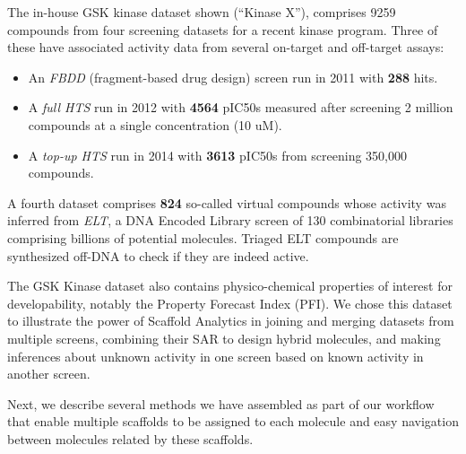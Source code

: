 \documentclass[journal=jacsat,biochem,manuscript=article]{achemso}
\newcommand*\tref[1]{Table~\ref{table:#1}}
\begin{document}
The in-house GSK kinase dataset shown (``Kinase X''), comprises 9259
compounds from four screening datasets for a recent kinase program.
Three of these have associated activity data from several on-target and off-target
assays: 
\begin{itemize}
\item An {\it FBDD}\cite{FBDD} (fragment-based drug design) screen run in 2011 with {\bf 288} hits.
\item A {\it full HTS} run in 2012 with {\bf 4564} {pIC50s} measured after screening 2 million compounds at a single concentration (10 uM).
\item A {\it top-up HTS} run in 2014 with {\bf 3613} {pIC50s} from screening 350,000 compounds.
\end{itemize}
A fourth dataset comprises {\bf 824} so-called virtual compounds whose activity was inferred from {\it ELT}, a DNA Encoded Library screen\cite{ELT} of 130
combinatorial libraries comprising billions of potential molecules. Triaged ELT compounds are synthesized off-DNA to check if they are indeed active. 

The GSK Kinase dataset also contains physico-chemical properties of interest for
developability, notably the Property Forecast Index (PFI\cite{Young2011}). 
We chose this dataset to illustrate the power of Scaffold Analytics in joining
and merging datasets from multiple screens, combining their SAR to
design hybrid molecules, and making inferences about unknown activity
in one screen based on known activity in another screen.


Next, we describe several methods we have assembled as part of our
workflow that enable multiple scaffolds to be assigned to each
molecule and easy navigation between molecules related by these
scaffolds.


\end{document}
